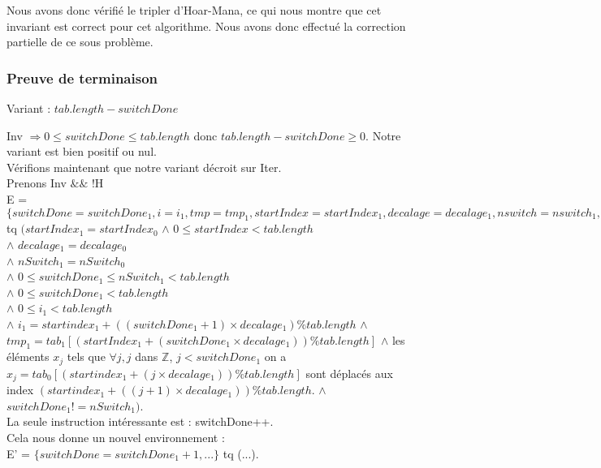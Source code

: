 Nous avons donc vérifié le tripler d'Hoar-Mana, ce qui nous montre que cet invariant est correct pour cet algorithme. 
Nous avons donc effectué la correction partielle de ce sous problème. 


\subsubsection*{Preuve de terminaison}
Variant  : $tab.length - switchDone$

Inv $\Rightarrow 0 \leq switchDone \leq tab.length$ donc $tab.length - switchDone \geq 0$. Notre variant est bien positif ou nul.\\ 

Vérifions maintenant que notre variant décroit sur Iter.\\

Prenons Inv $\&\&$ !H \\

E = $\{ switchDone = switchDone_{1}, i = i_{1}, tmp = tmp_{1}, startIndex = startIndex_{1}, decalage = decalage_{1}, nswitch = nswitch_{1}, tab = tab_{1}\}$\\
tq $(startIndex_{1} = startIndex_{0}$
$\wedge$ $0 \leq startIndex < tab.length$\\
$\wedge$ $decalage_{1} = decalage_{0}$\\
$\wedge$ $nSwitch_{1} = nSwitch_{0}$\\
$\wedge$ $0 \leq switchDone_{1} \leq nSwitch_{1} < tab.length$\\ 
$\wedge$ $0 \leq switchDone_{1} < tab.length$\\
$\wedge$ $0 \leq i_{1} < tab.length$\\
$\wedge$ $i_{1} = startindex_{1} + ((switchDone_{1}+1)\times decalage_{1}) \% tab.length$
$\wedge$ $tmp_{1} = tab_{1}[(startIndex_{1} + (switchDone_{1}\times decalage_{1})) \% tab.length]$
$\wedge$ les éléments $x_{j}$ tels que $\forall j, j$ dans $\mathbb{Z}$, $j<switchDone_{1}$ on a $x_{j}=tab_{0}[(startindex_{1} + (j\times decalage_{1})) \% tab.length]$ sont déplacés aux index $(startindex_{1} + ((j+1)\times decalage_{1})) \% tab.length$.
$\wedge$ $switchDone_{1} != nSwitch_{1})$.\\

La seule instruction intéressante est : switchDone++.\\
Cela nous donne un nouvel environnement :\\

E' = $\{switchDone = switchDone_{1}+1, ...\}$ tq (...).\\

